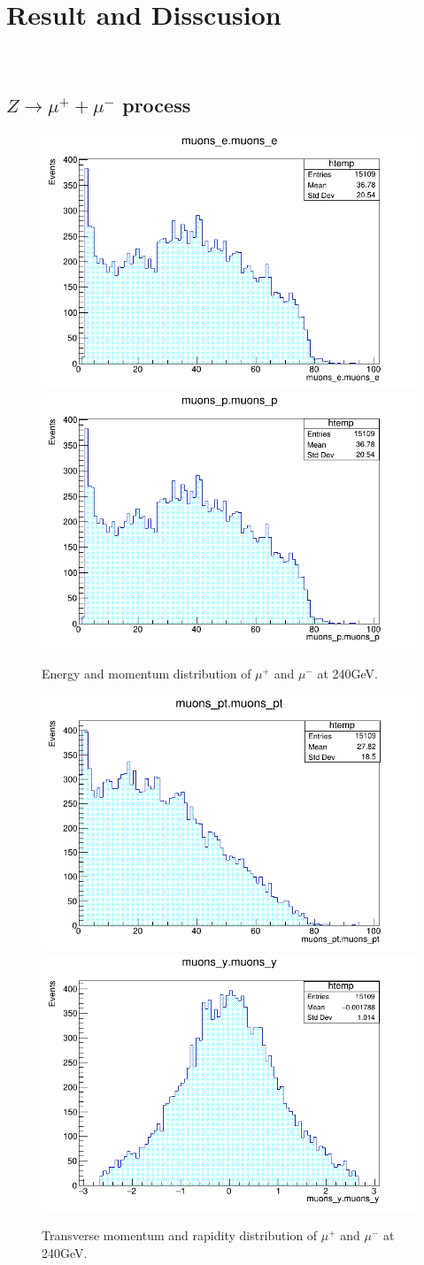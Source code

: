 \chapter{\label{result}Result and Disscusion}

\setcounter{equation}{0}
\setcounter{table}{0}
\setcounter{figure}{0}
\hspace{10pt}\\

\section{$Z\longrightarrow \mu^{+} + \mu^{-}$ process}
\begin{figure}[ht!]
    \centering
    \includegraphics[width=0.5\linewidth]{plots/plots/mue.png}\hfill
    \includegraphics[width=0.5\linewidth]{plots/plots/mup.png}
    \caption{Energy and momentum distribution of $\mu^{+}$ and $\mu^{-}$ at 240GeV.}
\end{figure}

\begin{figure}[ht!]
    \centering
    \includegraphics[width=0.5\linewidth]{plots/plots/mupt.png}\hfill
    \includegraphics[width=0.5\linewidth]{plots/plots/muy.png}
    \caption{Transverse momentum and rapidity  distribution of $\mu^{+}$ and $\mu^{-}$ at 240GeV.}
\end{figure}

